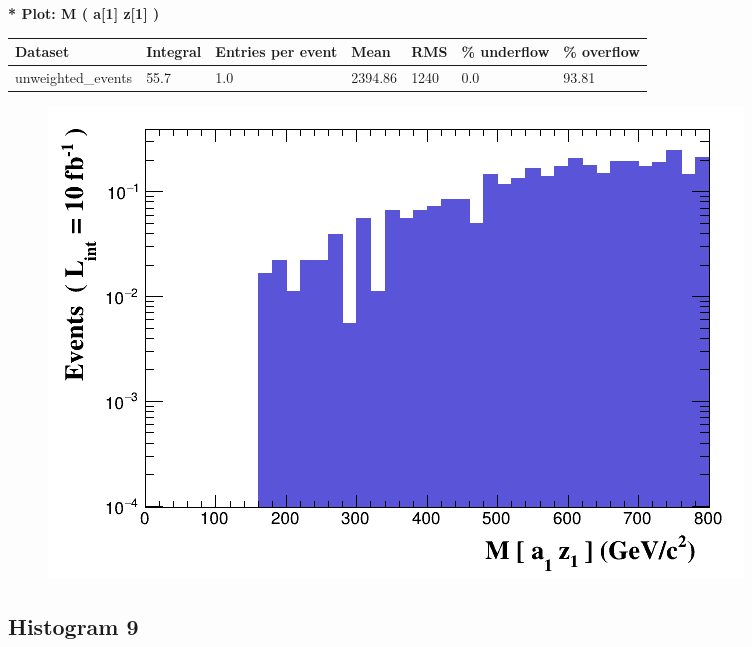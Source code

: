 \documentclass[a4paper, 10pt]{article}
\begin{document}
\textbf{* Plot: M ( a[1] z[1] ) }\\
   \begin{table}[H]
  \begin{center}
    \begin{tabular}{|m{23.0mm}|m{23.0mm}|m{18.0mm}|m{19.0mm}|m{19.0mm}|m{19.0mm}|m{19.0mm}|}
      \hline
      {\cellcolor{yellow}         Dataset}& {\cellcolor{yellow}         Integral}& {\cellcolor{yellow}         Entries per event}& {\cellcolor{yellow}         Mean}& {\cellcolor{yellow}         RMS}& {\cellcolor{yellow}         \% underflow}& {\cellcolor{yellow}         \% overflow}\\
      \hline
      {\cellcolor{white}         unweighted\_events}& {\cellcolor{white}         55.7}& {\cellcolor{white}         1.0}& {\cellcolor{white}         2394.86}& {\cellcolor{white}         1240}& {\cellcolor{red}         0.0}& {\cellcolor{red}         93.81}\\
\hline
    \end{tabular}
  \end{center}
\end{table}

\begin{figure}[H]
  \begin{center}
    \includegraphics[scale=0.45]{selection_7.png}\\
\caption{   }
  \end{center}
\end{figure}
      \newpage
\subsection{ Histogram 9}
\end{document}
